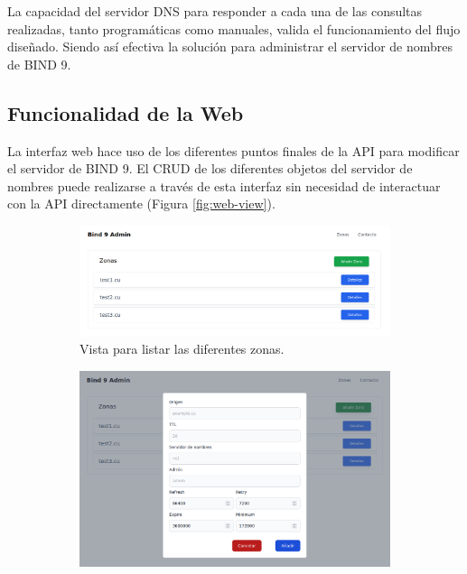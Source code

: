 La capacidad del servidor DNS para responder a cada una de las consultas realizadas, tanto programáticas como manuales, valida el funcionamiento del flujo diseñado. Siendo así efectiva la solución para administrar el servidor de nombres de BIND 9.

\subsection{Funcionalidad de la Web}

La interfaz web hace uso de los diferentes puntos finales de la API para modificar el servidor de BIND 9. El CRUD de los diferentes objetos del servidor de nombres puede realizarse a través de esta interfaz sin necesidad de interactuar con la API directamente (Figura \ref{fig:web-view}).

\begin{figure}
    \centering
    \begin{subfigure}{0.49\textwidth}
        \includegraphics[width=\textwidth]{Graphics/web/list-zones.png}
        \caption{Vista para listar las diferentes zonas.}
    \end{subfigure}
    \hfill
    \begin{subfigure}{0.49\textwidth}
        \includegraphics[width=\textwidth]{Graphics/web/add-zone.png}

\end{subfigure}
\end{figure}
